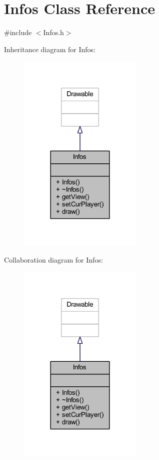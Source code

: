 \hypertarget{class_infos}{}\section{Infos Class Reference}
\label{class_infos}


{\ttfamily \#include $<$Infos.\+h$>$}



Inheritance diagram for Infos\+:\nopagebreak
\begin{figure}[H]
\begin{center}
\leavevmode
\includegraphics[width=168pt]{class_infos__inherit__graph}
\end{center}
\end{figure}


Collaboration diagram for Infos\+:\nopagebreak
\begin{figure}[H]
\begin{center}
\leavevmode
\includegraphics[width=168pt]{class_infos__coll__graph}
\end{center}
\end{figure}
